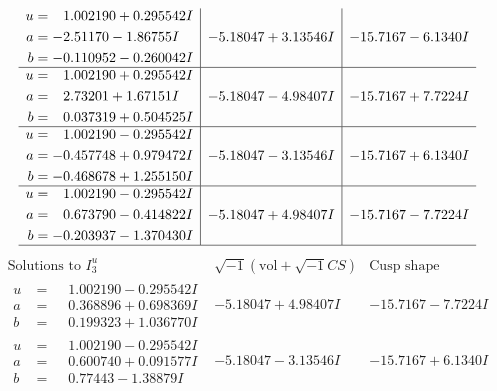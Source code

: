 \documentclass[1p]{elsarticle_modified}
\theoremstyle{definition}
\newcommand{\I}{\sqrt{-1}}
\begin{document}
$$\begin{array}{c|c|c}
\begin{aligned}
u &= \phantom{-}1.002190 + 0.295542 I \\
a &= -2.51170 - 1.86755 I \\
b &= -0.110952 - 0.260042 I\end{aligned}
 & -5.18047 + 3.13546 I & -15.7167 - 6.1340 I \\ \hline\begin{aligned}
u &= \phantom{-}1.002190 + 0.295542 I \\
a &= \phantom{-}2.73201 + 1.67151 I \\
b &= \phantom{-}0.037319 + 0.504525 I\end{aligned}
 & -5.18047 - 4.98407 I & -15.7167 + 7.7224 I \\ \hline\begin{aligned}
u &= \phantom{-}1.002190 - 0.295542 I \\
a &= -0.457748 + 0.979472 I \\
b &= -0.468678 + 1.255150 I\end{aligned}
 & -5.18047 - 3.13546 I & -15.7167 + 6.1340 I \\ \hline\begin{aligned}
u &= \phantom{-}1.002190 - 0.295542 I \\
a &= \phantom{-}0.673790 - 0.414822 I \\
b &= -0.203937 - 1.370430 I\end{aligned}
 & -5.18047 + 4.98407 I & -15.7167 - 7.7224 I\\
 \hline 
 \end{array}$$\newpage$$\begin{array}{c|c|c}  
\text{Solutions to }I^u_{3}& \I (\text{vol} + \sqrt{-1}CS) & \text{Cusp shape}\\
 \hline 
\begin{aligned}
u &= \phantom{-}1.002190 - 0.295542 I \\
a &= \phantom{-}0.368896 + 0.698369 I \\
b &= \phantom{-}0.199323 + 1.036770 I\end{aligned}
 & -5.18047 + 4.98407 I & -15.7167 - 7.7224 I \\ \hline\begin{aligned}
u &= \phantom{-}1.002190 - 0.295542 I \\
a &= \phantom{-}0.600740 + 0.091577 I \\
b &= \phantom{-}0.77443 - 1.38879 I\end{aligned}
 & -5.18047 - 3.13546 I & -15.7167 + 6.1340 I \\ \hline\begin{aligned}

\end{aligned}
\end{array}$$
\end{document}
